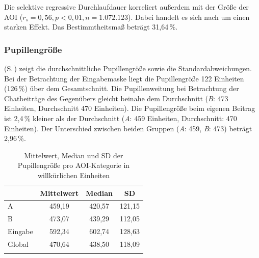 Die selektive regressive Durchlaufdauer korreliert außerdem mit der Größe der AOI ($r_{s} = 0,56, p < 0,01, n = 1.072.123$). Dabei handelt es sich nach \citet{cohen_power_1992} um einen starken Effekt. Das Bestimmtheitsmaß beträgt 31,64\,\%.


\subsubsection{Pupillengröße}
\label{K6:subsubsec:dede:psize}\largerpage



 (S.\,\pageref{K6:tab:DeDe:mean-sd-psize}) zeigt die durchschnittliche Pupillengröße sowie die Standardabweichungen. Bei der Betrachtung der Eingabemaske liegt die Pupillengröße 122 Einheiten (126\,\%) über dem Gesamtschnitt. Die Pupillenweitung bei Betrachtung der Chatbeiträge des Gegenübers gleicht beinahe dem Durchschnitt (\emph{B}: 473 Einheiten, Durchschnitt 470 Einheiten). Die Pupillengröße beim eigenen Beitrag ist 2,4\,\% kleiner als der Durchschnitt (\emph{A}: 459 Einheiten, Durchschnitt: 470 Einheiten). Der Unterschied zwischen beiden Gruppen (\emph{A}: 459, \emph{B}: 473) beträgt 2,96\,\%.



\begin{table}
    \begin{tabular}{lccc} 
    \lsptoprule
        \multicolumn{1}{c}{AOI-Kategorie} & \multicolumn{1}{c}{Mittelwert} & \multicolumn{1}{c}{Median} & \multicolumn{1}{c}{SD} \\ 
        \midrule
        A   & 459,19 & 420,57 & 121,15 \\ 
        B   & 473,07 & 439,29 & 112,05 \\ 
        Eingabe   & 592,34 & 602,74 & 128,63 \\ 
        \midrule
        Global  & 470,64 & 438,50 & 118,09\\
        \lspbottomrule
    \end{tabular}
    \caption[Mittelwert, Median und SD der Pupillengröße (AOI)]{Mittelwert, Median und SD der Pupillengröße pro AOI-Kategorie in willkürlichen Einheiten}
    \label{K6:tab:DeDe:mean-sd-psize}
\end{table}

